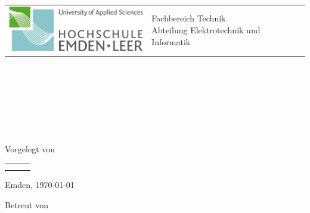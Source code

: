 \begin{titlepage}

	\hspace{-1.0cm}
	\begin{tabular}{p{8.0cm} p{8.0cm}}
		\includegraphics[width = 6.0cm]{logo/Technik.png} & %
		\parbox[b]{8.0cm}{
		{\large  Fachbereich Technik }                      \\ %
		{\large  Abteilung Elektrotechnik und Informatik } %
		}                                                   \\
		\\
		\hline
	\end{tabular}
	\begin{center}

		\vspace{2.5cm}
		\LARGE{\textsc{\praktikumstitel\\ %
				\semester}}\\ %

		\vspace{2cm}%
		\LARGE{\textsc{\versuchsnummer}}\\ %
		\LARGE{\versuchstitel} %

		\vspace{4cm}%
		\large

		\gruppe\\ %
		\studiengang\\\ \\ %
		Vorgelegt von\\ %

		\begin{table}[!ht]
			\centering
			\begin{tabular}{rll}
				\vornameStudEins & \nachnameStudEins & \matrikelnummerStudEins \\ %
				\vornameStudZwei & \nachnameStudZwei & \matrikelnummerStudZwei %
			\end{tabular}
		\end{table}


		\vspace{1cm}
		Emden, \today %

		\vspace{1.5cm}%
		Betreut von\\ %
		\betreuerEins\\ %
		\betreuerZwei %

	\end{center}
	\normalsize
\end{titlepage}

